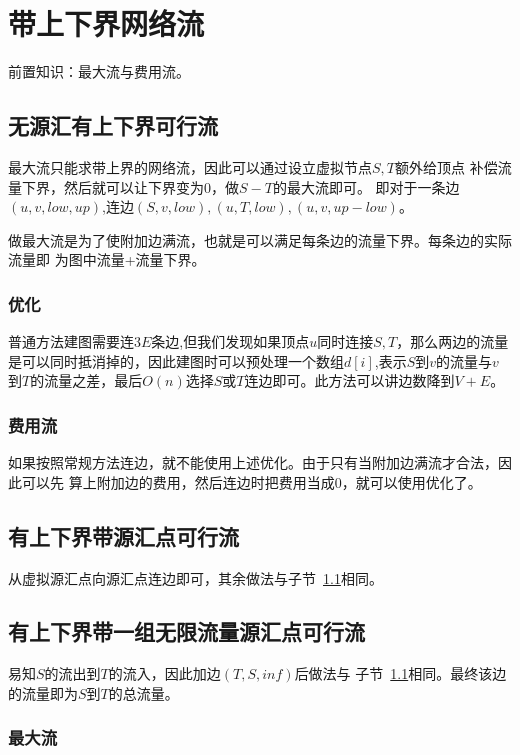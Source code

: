 \section{带上下界网络流}
前置知识：最大流与费用流。
\subsection{无源汇有上下界可行流}\label{LFA}
最大流只能求带上界的网络流，因此可以通过设立虚拟节点$S,T$额外给顶点
补偿流量下界，然后就可以让下界变为0，做$S-T$的最大流即可。
即对于一条边$(u,v,low,up)$,连边$(S,v,low),(u,T,low),(u,v,up-low)$。

做最大流是为了使附加边满流，也就是可以满足每条边的流量下界。每条边的实际流量即
为图中流量+流量下界。

\subsubsection{优化}

普通方法建图需要连$3E$条边,但我们发现如果顶点$u$同时连接$S,T$，那么两边的流量
是可以同时抵消掉的，因此建图时可以预处理一个数组$d[i]$,表示$S$到$v$的流量与$v$
到$T$的流量之差，最后$O(n)$选择$S$或$T$连边即可。此方法可以讲边数降到$V+E$。

\subsubsection{费用流}

如果按照常规方法连边，就不能使用上述优化。由于只有当附加边满流才合法，因此可以先
算上附加边的费用，然后连边时把费用当成0，就可以使用优化了。

\subsection{有上下界带源汇点可行流}

从虚拟源汇点向源汇点连边即可，其余做法与子节~\ref{LFA}相同。

\subsection{有上下界带一组无限流量源汇点可行流}

易知$S$的流出到$T$的流入，因此加边$(T,S,inf)$后做法与
子节~\ref{LFA}相同。最终该边的流量即为$S$到$T$的总流量。

\subsubsection{最大流}

